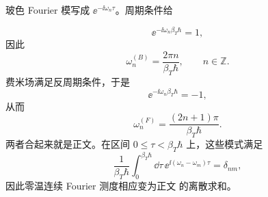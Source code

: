 \begin{derivation}
玻色 Fourier 模写成 $\ee^{-\ii\omega_n\tau}$。周期条件给

\begin{equation*}
 \ee^{-\ii\omega_n\beta_T\hbar}=1,
\end{equation*}
因此
\begin{equation*}
 \omega_n^{(B)}=\frac{2\pi n}{\beta_T\hbar},
 \qquad n\in\mathbb Z.
\end{equation*}
费米场满足反周期条件，于是
\begin{equation*}
 \ee^{-\ii\omega_n\beta_T\hbar}=-1,
\end{equation*}
从而
\begin{equation*}
 \omega_n^{(F)}=\frac{(2n+1)\pi}{\beta_T\hbar}.
\end{equation*}
两者合起来就是正文。在区间 $0\le\tau<\beta_T\hbar$ 上，这些模式满足
\begin{equation*}
 \frac1{\beta_T\hbar}\int_0^{\beta_T\hbar}\dd\tau\,
 \ee^{\ii(\omega_n-\omega_m)\tau}=\delta_{nm},
\end{equation*}
因此零温连续 Fourier 测度相应变为正文 的离散求和。
\end{derivation}
